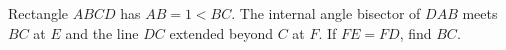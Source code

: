 Rectangle $ABCD$ has $AB=1<BC$. The internal angle bisector of $DAB$ meets $BC$ at $E$ and the line $DC$ extended beyond $C$ at $F$. If $FE=FD$, find $BC$.
